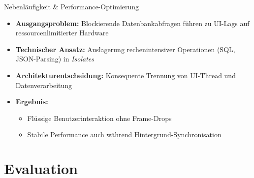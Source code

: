 \documentclass[10pt]{beamer}
\begin{document}
\begin{frame}{Nebenläufigkeit \& Performance-Optimierung}
    \begin{itemize}
        \item \textbf{Ausgangsproblem:}
        Blockierende Datenbankabfragen führen zu UI-Lags auf ressourcenlimitierter Hardware
        
        \item \textbf{Technischer Ansatz:}
        Auslagerung rechenintensiver Operationen (SQL, JSON-Parsing) in \textit{Isolates}
        
        \item \textbf{Architekturentscheidung:}
        Konsequente Trennung von UI-Thread und Datenverarbeitung
        
        \item \textbf{Ergebnis:}
        \begin{itemize}
            \item Flüssige Benutzerinteraktion ohne Frame-Drops
            \item Stabile Performance auch während Hintergrund-Synchronisation
        \end{itemize}
    \end{itemize}
\end{frame}

\section{Evaluation}
\end{document}
